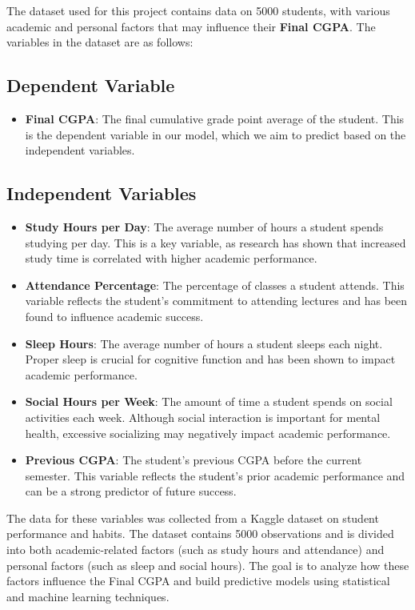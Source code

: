 \documentclass{article}
\begin{document}
The dataset used for this project contains data on 5000 students, with various academic and personal factors that may influence their \textbf{Final CGPA}. The variables in the dataset are as follows:

\subsection{Dependent Variable}
\begin{itemize}
    \item \textbf{Final CGPA}: The final cumulative grade point average of the student. This is the dependent variable in our model, which we aim to predict based on the independent variables.
\end{itemize}

\subsection{Independent Variables}
\begin{itemize}
    \item \textbf{Study Hours per Day}: The average number of hours a student spends studying per day. This is a key variable, as research has shown that increased study time is correlated with higher academic performance.
    \item \textbf{Attendance Percentage}: The percentage of classes a student attends. This variable reflects the student’s commitment to attending lectures and has been found to influence academic success.
    \item \textbf{Sleep Hours}: The average number of hours a student sleeps each night. Proper sleep is crucial for cognitive function and has been shown to impact academic performance.
    \item \textbf{Social Hours per Week}: The amount of time a student spends on social activities each week. Although social interaction is important for mental health, excessive socializing may negatively impact academic performance.
    \item \textbf{Previous CGPA}: The student’s previous CGPA before the current semester. This variable reflects the student’s prior academic performance and can be a strong predictor of future success.
\end{itemize}

The data for these variables was collected from a Kaggle dataset on student performance and habits. The dataset contains 5000 observations and is divided into both academic-related factors (such as study hours and attendance) and personal factors (such as sleep and social hours). The goal is to analyze how these factors influence the Final CGPA and build predictive models using statistical and machine learning techniques.
\end{document}
